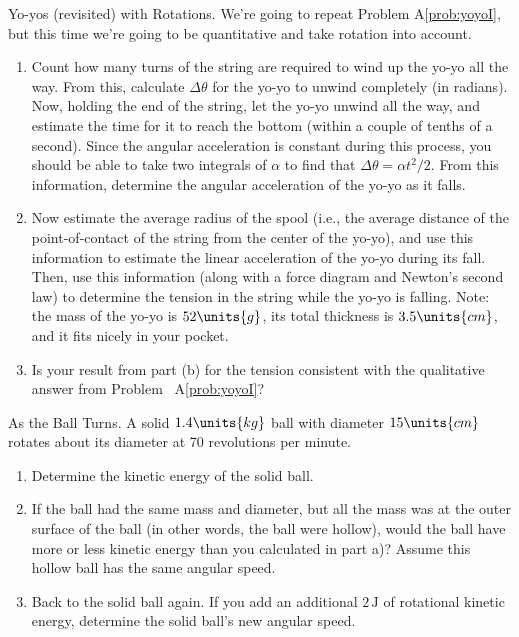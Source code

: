 \begin{aproblem}{Yo-yos (revisited) with Rotations.}
  We're going to repeat Problem A\ref{prob:yoyoI}, but this time we're
  going to be quantitative and take rotation into account.
  \begin{enumerate}
  \item Count how many turns of the string are required to wind up the
    yo-yo all the way.  From this, calculate $\Delta\theta$ for the
    yo-yo to unwind completely (in radians).  Now, holding the end of
    the string, let the yo-yo unwind all the way, and estimate the
    time for it to reach the bottom (within a couple of tenths of a
    second). Since the angular acceleration is constant during this
    process, you should be able to take two integrals of $\alpha$ to
    find that $\Delta\theta = \alpha t^2/2$.  From this information,
    determine the angular acceleration of the yo-yo as it falls.

  \item Now estimate the average radius of the spool (i.e., the
    average distance of the point-of-contact of the string from the
    center of the yo-yo), and use this information to estimate the
    linear acceleration of the yo-yo during its fall.  Then, use this
    information (along with a force diagram and Newton's second law)
    to determine the tension in the string while the yo-yo is falling.
    Note: the mass of the yo-yo is $52\units{g}$, its total
    thickness is $3.5\units{cm}$, and it fits nicely in your pocket.

  \item Is your result from part (b) for the tension consistent with
    the qualitative answer from Problem~ A\ref{prob:yoyoI}?

  \end{enumerate}
\end{aproblem}

\begin{aproblem}{As the Ball Turns.}
  A solid $1.4\units{kg}$ ball with diameter $15\units{cm}$
  rotates about its diameter at 70 revolutions per minute.
  \begin{enumerate}
  \item Determine the kinetic energy of the solid ball.
  \item If the ball had the same mass and diameter, but all the mass
    was at the outer surface of the ball (in other words, the ball
    were hollow), would the ball have more or less kinetic energy than
    you calculated in part a)?  Assume this hollow ball has the same
    angular speed.
  \item Back to the solid ball again.  If you add an additional $2\,
    \mbox{J}$ of rotational kinetic energy, determine the solid ball's
    new angular speed.
  \end{enumerate}
  \label{prob:ball_turns}
\end{aproblem}

